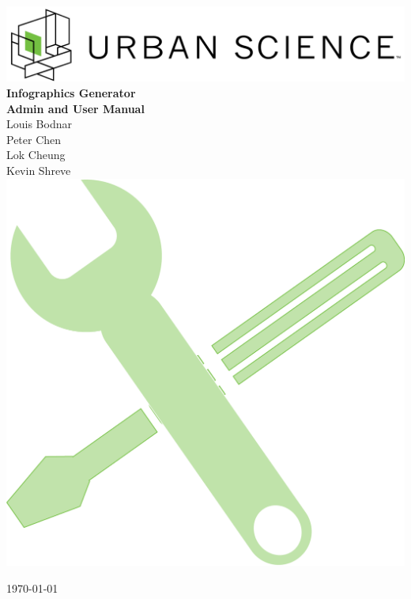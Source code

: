 \documentclass[11pt,a4paper,oneside]{article}
\begin{document}
\begin{titlepage}



\begin{center}

\includegraphics[width=1\textwidth]{images/sponsor-logo.png}\\[1cm]    

{ \huge \bfseries Infographics Generator}\\[0.4cm]
{ \large \bfseries Admin and User Manual}\\[0.4cm]

Louis Bodnar\\
Peter Chen\\
Lok Cheung\\
Kevin Shreve\\

\includegraphics[width=1\textwidth]{images/wrench3.png}\\   
\vfill

{\large \today}

\end{center}

\end{titlepage}
\end{document}
